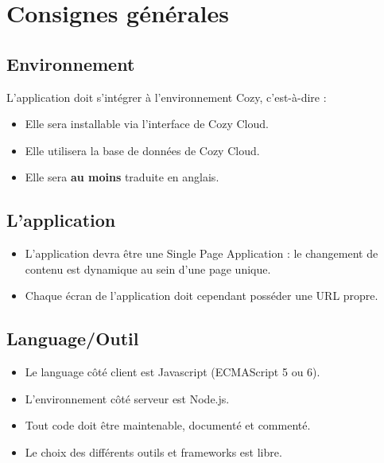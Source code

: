 \documentclass{42-fr}
\begin{document}

\chapter{Consignes g\'en\'erales}


    \section{Environnement}
        L'application doit s'int\'egrer \`a l'environnement Cozy, c'est-\`a-dire :

        \begin{itemize}\itemsep1pt
            \item Elle sera installable via l'interface de Cozy Cloud.
            \item Elle utilisera la base de donn\'ees de Cozy Cloud.
            \item Elle sera \textbf{au moins} traduite en anglais.
        \end{itemize}

    \section{L'application}
        \begin{itemize}\itemsep1pt
            \item L'application devra \^etre une Single Page Application :
				le changement de contenu est dynamique au sein d'une page unique.
            \item Chaque \'ecran de l'application doit cependant poss\'eder une URL propre.
        \end{itemize}

    \section{Language/Outil}
        \begin{itemize}\itemsep1pt
            \item Le language c\^ot\'e client est Javascript (ECMAScript 5 ou 6).
            \item L'environnement c\^ot\'e serveur est Node.js.
            \item Tout code doit \^etre maintenable, document\'e et comment\'e.
            \item Le choix des diff\'erents outils et frameworks est libre.
        \end{itemize}
\end{document}
